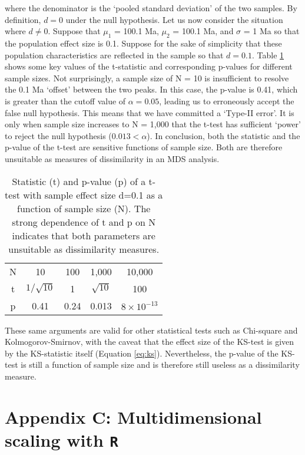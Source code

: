 \documentclass[authoryear,preprint,review,12pt]{elsarticle}
\begin{document}
where the denominator is the `pooled standard deviation' of the two
samples. By definition, $d = 0$ under the null hypothesis. Let us now
consider the situation where $d \neq 0$. Suppose that $\mu_1$ = 100.1
Ma, $\mu_2$ = 100.1 Ma, and $\sigma$ = 1 Ma so that the population
effect size is 0.1. Suppose for the sake of simplicity that these
population characteristics are reflected in the sample so that $d =
0.1$. Table \ref{tab:tstat} shows some key values of the t-statistic
and corresponding p-values for different sample sizes.  Not
surprisingly, a sample size of N = 10 is insufficient to resolve the
0.1 Ma `offset' between the two peaks. In this case, the p-value is
0.41, which is greater than the cutoff value of $\alpha = 0.05$,
leading us to erroneously accept the false null hypothesis. This means
that we have committed a `Type-II error'. It is only when sample size
increases to N = 1,000 that the t-test has sufficient `power' to
reject the null hypothesis ($0.013 < \alpha$).  In conclusion, both
the statistic and the p-value of the t-test are sensitive functions of
sample size. Both are therefore unsuitable as measures of
dissimilarity in an MDS analysis.

\begin{table}[here]
\centering
\begin{tabular}{c|cccc}
N & 10 & 100 & 1,000 & 10,000\\
t & $1/\sqrt{10}$ & 1 & $\sqrt{10}$ & 100\\
p & 0.41 & 0.24 & 0.013 & $8\times10^{-13}$
\end{tabular}
\label{tab:tstat}
\caption{Statistic (t) and p-value (p) of a t-test with sample effect
  size d=0.1 as a function of sample size (N).  The strong dependence
  of t and p on N indicates that both parameters are unsuitable as
  dissimilarity measures.}
\end{table}

These same arguments are valid for other statistical tests such as
Chi-square and Kolmogorov-Smirnov, with the caveat that the effect
size of the KS-test is given by the KS-statistic itself (Equation
\ref{eq:ks}).  Nevertheless, the p-value of the KS-test is still a
function of sample size and is therefore still useless as a
dissimilarity measure.

\section*{Appendix C: Multidimensional scaling with \texttt{R}}
\end{document}
